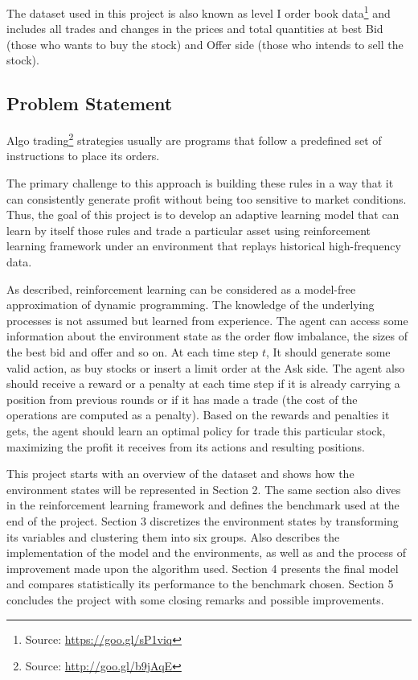 \documentclass[a4paper]{article}
\begin{document}
The dataset used in this project is also known as level I order book data\footnote{Source: \url{https://goo.gl/sP1viq}} and includes all trades and changes in the prices and total quantities at best Bid (those who wants to buy the stock) and Offer side (those who intends to sell the stock).


\subsection{Problem Statement}
Algo trading\footnote{Source: \url{http://goo.gl/b9jAqE}} strategies usually are programs that follow a predefined set of instructions to place its orders. 

The primary challenge to this approach is building these rules in a way that it can consistently generate profit without being too sensitive to market conditions. Thus, the goal of this project is to develop an adaptive learning model that can learn by itself those rules and trade a particular asset using reinforcement learning framework under an environment that replays historical high-frequency data.

As \cite{chan2001electronic} described, reinforcement learning can be considered as a model-free approximation of dynamic programming. The knowledge of the underlying processes is not assumed but learned from experience. The agent can access some information about the environment state as the order flow imbalance, the sizes of the best bid and offer and so on. At each time step $t$, It should generate some valid action, as buy stocks or insert a limit order at the Ask side. The agent also should receive a reward or a penalty at each time step if it is already carrying a position from previous rounds or if it has made a trade (the cost of the operations are computed as a penalty). Based on the rewards and penalties it gets, the agent should learn an optimal policy for trade this particular stock, maximizing the profit it receives from its actions and resulting positions.

This project starts with an overview of the dataset and shows how the environment states will be represented in Section 2. The same section also dives in the reinforcement learning framework and defines the benchmark used at the end of the project. Section 3 discretizes the environment states by transforming its variables and clustering them into six groups. Also describes the implementation of the model and the environments, as well as and the process of improvement made upon the algorithm used. Section 4 presents the final model and compares statistically its performance to the benchmark chosen. Section 5 concludes the project with some closing remarks and possible improvements.
\end{document}
